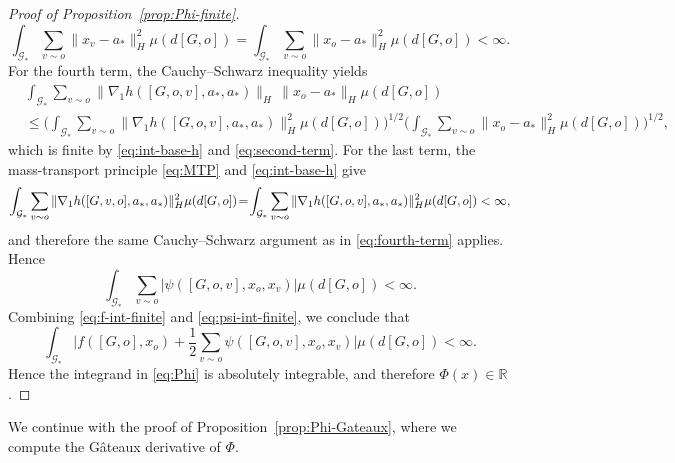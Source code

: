 \documentclass[11pt]{article}
\newcommand{\be}{\begin{equation}}
\newcommand{\ee}{\end{equation}}
\numberwithin{equation}{section}
\begin{document}
\begin{proof}[Proof of Proposition~\ref{prop:Phi-finite}]
\[\int_{\mathcal G_\ast}\sum_{v\sim o}\|x_v-a_\ast\|_H^2\mu(d[G,o])
=
\int_{\mathcal G_\ast}\sum_{v\sim o}\|x_o-a_\ast\|_H^2\mu(d[G,o])<\infty.
\]
For the fourth term, the Cauchy--Schwarz inequality yields
\be\begin{aligned}\label{eq:fourth-term}
&\int_{\mathcal G_\ast}\sum_{v\sim o}\|\nabla_1 h([G,o,v],a_\ast,a_\ast)\|_H\,\|x_o-a_\ast\|_H\mu(d[G,o]) \\
&\le
\bigg(
\int_{\mathcal G_\ast}\sum_{v\sim o}\|\nabla_1 h([G,o,v],a_\ast,a_\ast)\|_H^2\mu(d[G,o])
\bigg)^{1/2}
\bigg(
\int_{\mathcal G_\ast}\sum_{v\sim o}\|x_o-a_\ast\|_H^2\mu(d[G,o])
\bigg)^{1/2},
\end{aligned}\ee
which is finite by \eqref{eq:int-base-h} and \eqref{eq:second-term}. For the last term, the mass-transport principle \eqref{eq:MTP} and \eqref{eq:int-base-h} give
\[
\int_{\mathcal G_\ast}\sum_{v\sim o}\|\nabla_1 h([G,v,o],a_\ast,a_\ast)\|_H^2\mu(d[G,o])
\hspace{-0.6mm}=\hspace{-0.7mm}
\int_{\mathcal G_\ast}\sum_{v\sim o}\|\nabla_1 h([G,o,v],a_\ast,a_\ast)\|_H^2\mu(d[G,o])<\infty,
\]
and therefore the same Cauchy--Schwarz argument as in \eqref{eq:fourth-term} applies. Hence
\begin{equation} \label{eq:psi-int-finite}
\int_{\mathcal G_\ast}\sum_{v\sim o}|\psi([G,o,v],x_o,x_v)|\mu(d[G,o])<\infty.
\end{equation}
Combining \eqref{eq:f-int-finite} and \eqref{eq:psi-int-finite}, we conclude that
\[
\int_{\mathcal G_\ast}
\Big|
f([G,o],x_o)
+
\frac12\sum_{v\sim o}\psi([G,o,v],x_o,x_v)
\Big|
\mu(d[G,o])<\infty.
\]
Hence the integrand in \eqref{eq:Phi} is absolutely integrable, and therefore \(\Phi(x)\in\mathbb R\).
\end{proof}



We continue with the proof of Proposition~\ref{prop:Phi-Gateaux}, where we compute the G\^ateaux derivative of $\Phi$.
\end{document}
